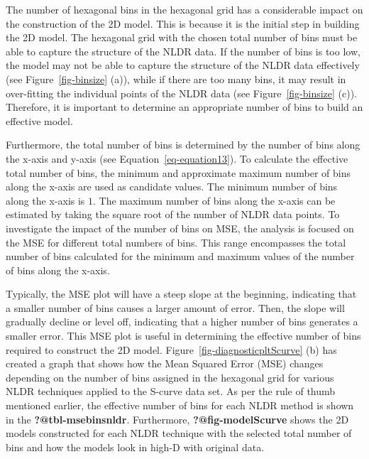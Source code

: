 \documentclass[
  12pt]{article}
\begin{document}
The number of hexagonal bins in the hexagonal grid has a considerable
impact on the construction of the 2D model. This is because it is the
initial step in building the 2D model. The hexagonal grid with the
chosen total number of bins must be able to capture the structure of the
NLDR data. If the number of bins is too low, the model may not be able
to capture the structure of the NLDR data effectively (see
Figure~\ref{fig-binsize} (a)), while if there are too many bins, it may
result in over-fitting the individual points of the NLDR data (see
Figure~\ref{fig-binsize} (c)). Therefore, it is important to determine
an appropriate number of bins to build an effective model.

Furthermore, the total number of bins is determined by the number of
bins along the x-axis and y-axis (see Equation~\ref{eq-equation13}). To
calculate the effective total number of bins, the minimum and
approximate maximum number of bins along the x-axis are used as
candidate values. The minimum number of bins along the x-axis is \(1\).
The maximum number of bins along the x-axis can be estimated by taking
the square root of the number of NLDR data points. To investigate the
impact of the number of bins on MSE, the analysis is focused on the MSE
for different total numbers of bins. This range encompasses the total
number of bins calculated for the minimum and maximum values of the
number of bins along the x-axis.

Typically, the MSE plot will have a steep slope at the beginning,
indicating that a smaller number of bins causes a larger amount of
error. Then, the slope will gradually decline or level off, indicating
that a higher number of bins generates a smaller error. This MSE plot is
useful in determining the effective number of bins required to construct
the 2D model. Figure~\ref{fig-diagnosticpltScurve} (b) has created a
graph that shows how the Mean Squared Error (MSE) changes depending on
the number of bins assigned in the hexagonal grid for various NLDR
techniques applied to the S-curve data set. As per the rule of thumb
mentioned earlier, the effective number of bins for each NLDR method is
shown in the \textbf{?@tbl-msebinsnldr}. Furthermore,
\textbf{?@fig-modelScurve} shows the 2D models constructed for each NLDR
technique with the selected total number of bins and how the models look
in high-D with original data.
\end{document}
